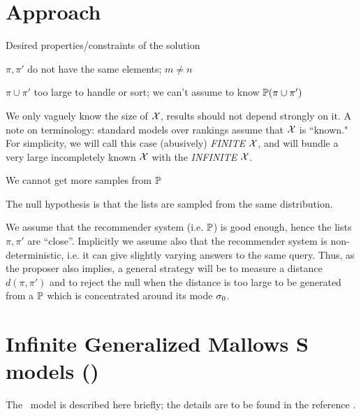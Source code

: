 \documentclass[10pt]{article}
\begin{document}
\section{Approach}
\label{sec:approach}
Desired properties/constraints of the solution
\benum
\item $\pi,\pi'$ do not have the same elements; $m\neq n$
\item $\pi \cup \pi'$ too large to handle or sort; we can't assume to know ${\mathbb P}(\pi \cup \pi')$
\item We only vaguely know the size of ${\mathcal X}$, results should not depend strongly on it. A note on terminology: standard models over rankings assume that ${\mathcal X}$ is ``known." For simplicity, we will call this case (abusively) {\em FINITE} ${\mathcal X}$, and will bundle a very large incompletely known ${\mathcal X}$ with the {\em INFINITE} ${\mathcal X}$.
\item We cannot get more samples from ${\mathbb P}$
\item The null hypothesis is that the lists are sampled from the same distribution.
\item We assume that the recommender system (i.e. ${\mathbb P}$) is good enough, hence the lists $\pi,\pi'$ are ``close''. Implicitly we assume also that the recommender system is non-deterministic, i.e. it can give slightly varying answers to the same query.  
  \eenum
Thus, as the proposer also implies, a general strategy will be to measure a distance $d(\pi,\pi')$ and to reject the null when the distance is too large to be generated from a ${\mathbb P}$ which is concentrated around its mode $\sigma_0$. 

\section{Infinite Generalized Mallows S models (\gmms)}
\label{sec:gmms}

The \gmms~model is described here briefly; the details are to be found in the reference
\cite{MBao}.
\end{document}

